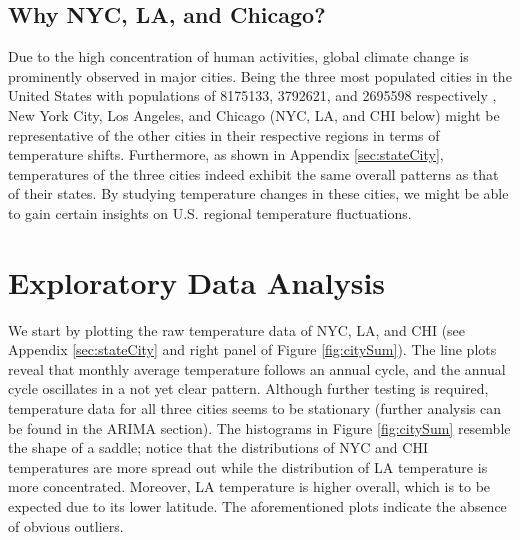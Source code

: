 \documentclass[12pt]{article}
\begin{document}
\subsection{Why NYC, LA, and Chicago?}
Due to the high concentration of human activities, global climate change is prominently observed in major cities. Being the three most populated cities in the United States with populations of 8175133, 3792621, and 2695598 respectively \cite{uscb}, New York City, Los Angeles, and Chicago (NYC, LA, and CHI below) might be representative of the other cities in their respective regions in terms of temperature shifts. Furthermore, as shown in Appendix \ref{sec:stateCity}, temperatures of the three cities indeed exhibit the same overall patterns as that of their states. By studying temperature changes in these cities, we might be able to gain certain insights on U.S. regional temperature fluctuations. 




\section{Exploratory Data Analysis}
We start by plotting the raw temperature data of NYC, LA, and CHI (see Appendix \ref{sec:stateCity} and right panel of Figure \ref{fig:citySum}). The line plots reveal that monthly average temperature follows an annual cycle, and the annual cycle oscillates in a not yet clear pattern. Although further testing is required, temperature data for all three cities seems to be stationary (further analysis can be found in the ARIMA section). The histograms in Figure \ref{fig:citySum} resemble the shape of a saddle; notice that the distributions of NYC and CHI temperatures are more spread out while the distribution of LA temperature is more concentrated. Moreover, LA temperature is higher overall, which is to be expected due to its lower latitude. The aforementioned plots indicate the absence of obvious outliers.
\end{document}
